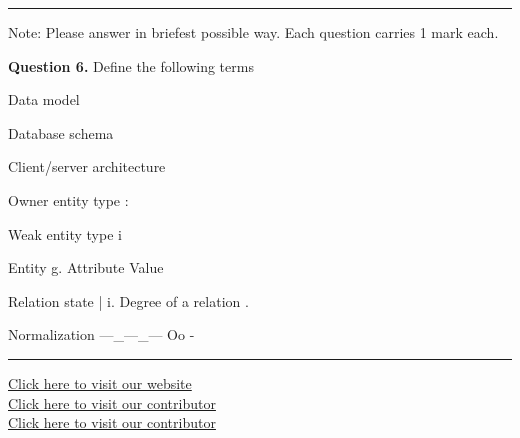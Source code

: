 \documentclass[11pt,a4paper]{article}
\begin{document}
\bigskip{}
\rule{\linewidth}{0.4pt}\smallskip

Note: Please answer in briefest possible way. Each question carries 1 mark each.

\medskip\noindent\textbf{Question 6.} Define the following terms
\begin{parts}
  \item Data model
  \item Database schema
  \item Client/server architecture
  \item Owner entity type :
  \item Weak entity type i
  \item Entity
g. Attribute Value
  \item Relation state
  | i. Degree of a relation .
  \item Normalization
  —\_—\_— Oo -
\end{parts}

\vfill
\rule{\linewidth}{0.4pt}
\begin{center}\small
\href{https://bhu-exam.vercel.app/}{Click here to visit our website}\\[4pt]\href{https://me-aryan.vercel.app/}{Click here to visit our contributor}\\[4pt]\href{https://quashan-me.vercel.app/}{Click here to visit our contributor}
\end{center}
\end{document}
